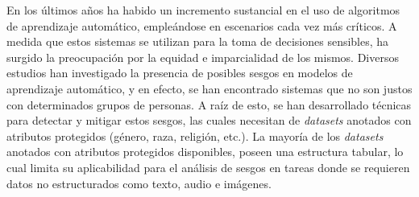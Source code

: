 \begin{resumen}
	

	En los \'ultimos a\~nos ha habido un incremento sustancial en el uso de algoritmos de aprendizaje autom\'atico, emple\'andose en
	escenarios cada vez m\'as cr\'iticos. A medida que estos sistemas se utilizan para la toma de decisiones sensibles, ha surgido 
	la preocupaci\'on por la equidad e imparcialidad de los mismos. Diversos estudios han investigado la presencia de posibles sesgos
    en modelos de aprendizaje autom\'atico, y en efecto, se han encontrado sistemas que no son justos con determinados grupos de personas.
	A ra\'iz de esto, se han desarrollado t\'ecnicas para detectar y mitigar estos sesgos, las cuales necesitan de \emph{datasets} anotados
	con atributos protegidos (g\'enero, raza, religi\'on, etc.). La mayor\'ia de los \emph{datasets} anotados con atributos protegidos 
	disponibles, poseen una estructura tabular, lo cual limita su aplicabilidad para el an\'alisis de sesgos en tareas donde se 
	requieren datos no estructurados como texto, audio e im\'agenes.
	

\end{resumen}

